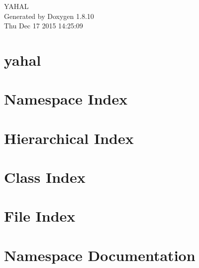 \documentclass[twoside]{book}
\newcommand{\+}{\discretionary{\mbox{\scriptsize$\hookleftarrow$}}{}{}}
\newcommand{\clearemptydoublepage}{%
  \newpage{\pagestyle{empty}\cleardoublepage}%
}
\begin{document}
\hypersetup{pageanchor=false,
             bookmarks=true,
             bookmarksnumbered=true,
             pdfencoding=unicode
            }
\begin{titlepage}
\vspace*{7cm}
\begin{center}%
{\Large Y\+A\+H\+A\+L }\\
\vspace*{1cm}
{\large Generated by Doxygen 1.8.10}\\
\vspace*{0.5cm}
{\small Thu Dec 17 2015 14:25:09}\\
\end{center}
\end{titlepage}
\clearemptydoublepage
\tableofcontents
\clearemptydoublepage
{}
\hypersetup{pageanchor=true}

\chapter{yahal}
\label{md__home_andy__documentos__source_yahal__r_e_a_d_m_e}
\hypertarget{md__home_andy__documentos__source_yahal__r_e_a_d_m_e}{}

\chapter{Namespace Index}

\chapter{Hierarchical Index}

\chapter{Class Index}

\chapter{File Index}

\chapter{Namespace Documentation}


\end{document}
